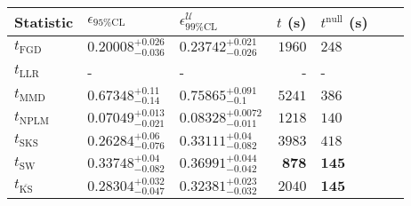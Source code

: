 \begin{tabular}{l|llr|llr}
	Statistic & $\epsilon_{95\%\mathrm{CL}}$ & $\epsilon^    {\mathcal{U}}_{99\%\mathrm{CL}}$ & $t$ (s) & $t^{\mathrm{null}}$ (s) \\
	\midrule
	$t_{\mathrm{FGD}}$ & ${\mathbf{0.20008_{-0.036}^{+0.026}}}$ & ${\mathbf{0.23742_{-0.026}^{+0.021}}}$ & $1960$ & $248$ \\
	$t_{\mathrm{LLR}}$ & - & - & - & - \\
	$t_{\mathrm{MMD}}$ & $0.67348_{-0.14}^{+0.11}$ & $0.75865_{-0.1}^{+0.091}$ & $5241$ & $386$ \\
\rowcolor{red!35}	$t_{\mathrm{NPLM}}$ & $0.07049_{-0.021}^{+0.013}$ & $0.08328_{-0.011}^{+0.0072}$ & $1218$ & $140$ \\
	$t_{\mathrm{SKS}}$ & $0.26284_{-0.076}^{+0.06}$ & $0.33111_{-0.082}^{+0.04}$ & $3983$ & $418$ \\
	$t_{\mathrm{SW}}$ & $0.33748_{-0.082}^{+0.04}$ & $0.36991_{-0.042}^{+0.044}$ & ${\mathbf{878}}$ & ${\mathbf{145}}$ \\
	$t_{\overline{\mathrm{KS}}}$ & $0.28304_{-0.047}^{+0.032}$ & $0.32381_{-0.032}^{+0.023}$ & $2040$ & ${\mathbf{145}}$ \\
	\bottomrule
\end{tabular}